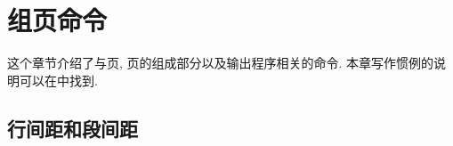 

\chapter {组页命令}


这个章节介绍了与页, 页的组成部分以及输出程序相关的命令.
本章写作惯例的说明可以在中找到.

\begindescriptions

\section {行间距和段间距}

